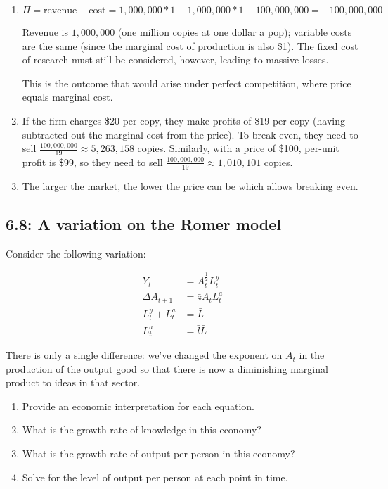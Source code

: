 \documentclass{article}
\newenvironment{solution}{\color{red}}{\color{black}}
\begin{document}
\begin{solution}
\begin{enumerate}
\item $\Pi = \text{revenue} - \text{cost} = 1,000,000*1 - 1,000,000*1 - 100,000,000 = -100,000,000$

Revenue is $1,000,000$ (one million copies at one dollar a pop); variable costs are the same (since the marginal cost of production is also \$1). The fixed cost of research must still be considered, however, leading to massive losses.

This is the outcome that would arise under perfect competition, where price equals marginal cost.

\item If the firm charges \$20 per copy, they make profits of \$19 per copy (having subtracted out the marginal cost from the price). To break even, they need to sell $\frac{100,000,000}{19} \approx 5,263,158$ copies. Similarly, with a price of \$100, per-unit profit is \$99, so they need to sell $\frac{100,000,000}{19} \approx 1,010,101$ copies.

\item The larger the market, the lower the price can be which allows breaking even.

\end{enumerate}

\end{solution}

\subsection*{6.8: A variation on the Romer model}

Consider the following variation:

\begin{align*}
Y_t &= A_t^{\frac12} L^y_t \\
\Delta A_{t+1} &= \bar{z} A_t L^a_t \\
L^y_t + L^a_t &= \bar{L} \\
L^a_t &= \bar{l} \bar{L}
\end{align*}

There is only a single difference: we've changed the exponent on $A_t$ in the production of the output good so that there is now a diminishing marginal product to ideas in that sector.

\begin{enumerate}
\item Provide an economic interpretation for each equation.
\item What is the growth rate of knowledge in this economy?
\item What is the growth rate of output per person in this economy?
\item Solve for the level of output per person at each point in time.
\end{enumerate}
\end{document}
